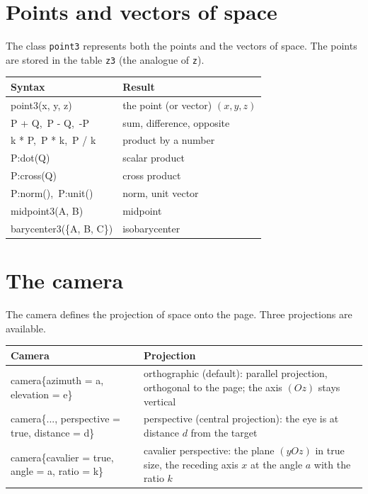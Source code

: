 \documentclass[11pt]{article}
\newcommand\code[1]{\texttt{#1}}
\begin{document}
\section{Points and vectors of space}

The class \code{point3} represents both the points and the vectors of space.
The points are stored in the table \code{z3} (the analogue of \code{z}).

\begin{center}
\begin{tabular}{>{\ttfamily}l l}
\toprule
\textrm{Syntax} & Result \\
\midrule
point3(x, y, z)          & the point (or vector) $(x, y, z)$ \\
P + Q,\ P - Q,\ -P       & sum, difference, opposite \\
k * P,\ P * k,\ P / k    & product by a number \\
P:dot(Q)                 & scalar product \\
P:cross(Q)               & cross product \\
P:norm(),\ P:unit()      & norm, unit vector \\
midpoint3(A, B)          & midpoint \\
barycenter3(\{A, B, C\}) & isobarycenter \\
\bottomrule
\end{tabular}
\end{center}

\section{The camera}

The camera defines the projection of space onto the page. Three
projections are available.

\begin{center}
\begin{tabular}{>{\ttfamily}l p{9cm}}
\toprule
\textrm{Camera} & Projection \\
\midrule
camera\{azimuth = a, elevation = e\} &
  orthographic (default): parallel projection, orthogonal to the page;
  the axis $(Oz)$ stays vertical \\
camera\{..., perspective = true, distance = d\} &
  perspective (central projection): the eye is at distance $d$ from the
  target \\
camera\{cavalier = true, angle = a, ratio = k\} &
  cavalier perspective: the plane $(yOz)$ in true size, the receding axis
  $x$ at the angle $a$ with the ratio $k$ \\
\bottomrule
\end{tabular}
\end{center}
\end{document}
